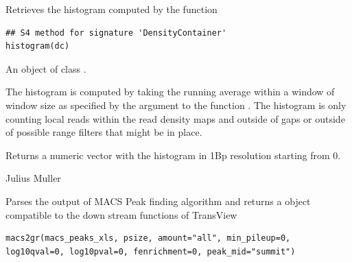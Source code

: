 \documentclass[letterpaper]{book}
\begin{document}
%
\begin{Description}
Retrieves the histogram computed by the  function
\end{Description}
%
\begin{Usage}
\begin{verbatim}
## S4 method for signature 'DensityContainer'
histogram(dc)
\end{verbatim}
\end{Usage}
%
\begin{Arguments}

\begin{ldescription}
\item[\code{dc}] 
An object of class .

\end{ldescription}
\end{Arguments}
%
\begin{Details}
The histogram is computed by taking the running average within a window of window size as specified by the argument  to the function . 
The histogram is only counting local reads within the read density maps and outside of gaps or outside of possible range filters that might be in place.
\end{Details}
%
\begin{Value}
Returns a numeric vector with the histogram in 1Bp resolution starting from 0.
\end{Value}
%
\begin{Author}
Julius Muller 
\end{Author}
%
\begin{Description}

Parses the output of MACS Peak finding algorithm and returns a  object compatible to the down stream functions of TransView

\end{Description}
%
\begin{Usage}
\begin{verbatim}
macs2gr(macs_peaks_xls, psize, amount="all", min_pileup=0, log10qval=0, log10pval=0, fenrichment=0, peak_mid="summit")
\end{verbatim}
\end{Usage}
\end{document}
